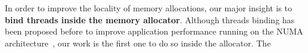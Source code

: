 



In order to improve the locality of memory allocations, our major insight is to \textbf{bind threads inside the memory allocator}. Although threads binding has been proposed before to improve application performance running on the NUMA architecture~\cite{},  our work is the first one to do so inside the allocator. The 

